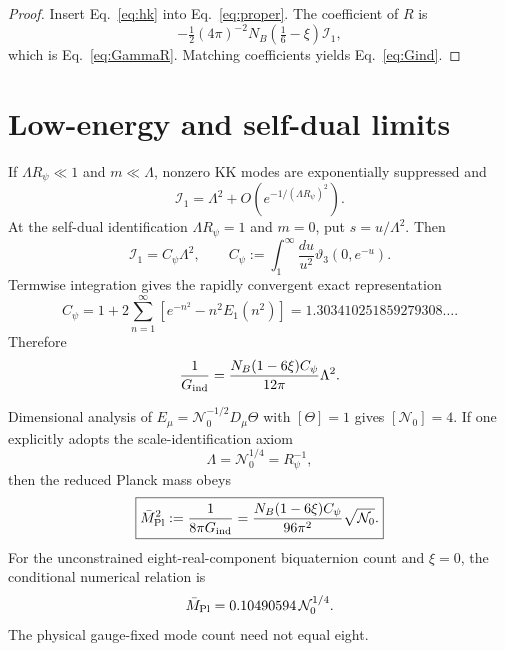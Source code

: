 \documentclass[11pt,a4paper]{article}
\begin{document}
\begin{proof}
Insert Eq.~\eqref{eq:hk} into Eq.~\eqref{eq:proper}.  The coefficient of $R$
is
\[-\tfrac12(4\pi)^{-2}N_B(\tfrac16-\xi)\mathcal I_1,\]
which is Eq.~\eqref{eq:GammaR}.  Matching coefficients yields
Eq.~\eqref{eq:Gind}.
\end{proof}

\section{Low-energy and self-dual limits}
If $\Lambda R_\psi\ll1$ and $m\ll\Lambda$, nonzero KK modes are exponentially
suppressed and
\begin{equation}
 \mathcal I_1=\Lambda^2+O(e^{-1/(\Lambda R_\psi)^2}).
\end{equation}
At the self-dual identification $\Lambda R_\psi=1$ and $m=0$, put
$s=u/\Lambda^2$.  Then
\begin{equation}
 \mathcal I_1=C_\psi\Lambda^2,
 \qquad
 C_\psi:=\int_1^\infty\frac{du}{u^2}
 \vartheta_3(0,e^{-u}).
\end{equation}
Termwise integration gives the rapidly convergent exact representation
\begin{equation}
 C_\psi=1+2\sum_{n=1}^\infty
 \left[e^{-n^2}-n^2E_1(n^2)\right]
 =1.303410251859279308\ldots .
 \label{eq:Cpsi}
\end{equation}
Therefore
\begin{equation}
 \frac1{G_{\rm ind}}
 =\frac{N_B(1-6\xi)C_\psi}{12\pi}\Lambda^2.
 \label{eq:Gself}
\end{equation}

Dimensional analysis of $E_\mu=\mathcal N_0^{-1/2}D_\mu\Theta$ with
$[\Theta]=1$ gives $[\mathcal N_0]=4$.  If one explicitly adopts the
scale-identification axiom
\begin{equation}
 \Lambda=\mathcal N_0^{1/4}=R_\psi^{-1},
 \label{eq:scaleaxiom}
\end{equation}
then the reduced Planck mass obeys
\begin{equation}
 \boxed{
 \bar M_{\rm Pl}^2:=\frac1{8\pi G_{\rm ind}}
 =\frac{N_B(1-6\xi)C_\psi}{96\pi^2}\sqrt{\mathcal N_0}.}
 \label{eq:Mpl}
\end{equation}
For the unconstrained eight-real-component biquaternion count and $\xi=0$,
the conditional numerical relation is
\[
 \bar M_{\rm Pl}=0.10490594\,\mathcal N_0^{1/4}.
\]
The physical gauge-fixed mode count need not equal eight.
\end{document}
